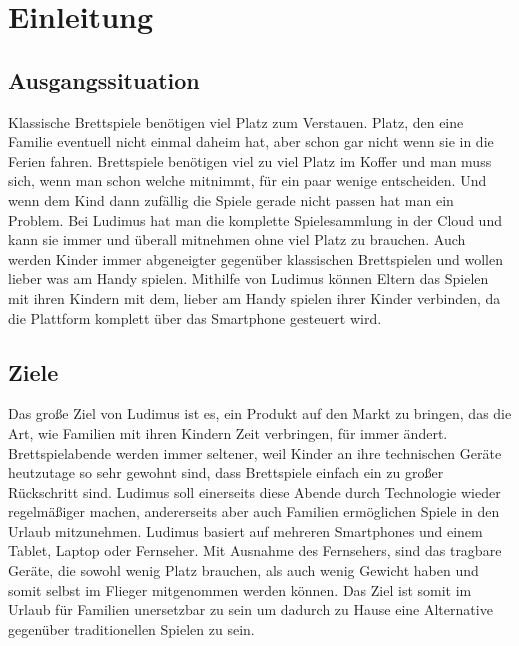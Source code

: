 \chapter{Einleitung}
\section{Ausgangssituation}
Klassische Brettspiele benötigen viel Platz zum Verstauen. Platz, den eine Familie eventuell nicht einmal daheim hat, aber schon gar nicht wenn sie in die Ferien fahren. Brettspiele benötigen viel zu viel Platz im Koffer und man muss sich, wenn man schon welche mitnimmt, für ein paar wenige entscheiden. Und wenn dem Kind dann zufällig die Spiele gerade nicht passen hat man ein Problem. Bei Ludimus hat man die komplette Spielesammlung in der Cloud und kann sie immer und überall mitnehmen ohne viel Platz zu brauchen.
\newline 
Auch werden Kinder immer abgeneigter gegenüber klassischen Brettspielen und wollen lieber was am Handy spielen. Mithilfe von Ludimus können Eltern das Spielen mit ihren Kindern mit dem,  lieber am Handy spielen ihrer Kinder verbinden, da die Plattform komplett über das Smartphone gesteuert wird.

\section{Ziele}
Das große Ziel von Ludimus ist es, ein Produkt auf den Markt zu bringen, das die Art, wie Familien mit ihren Kindern Zeit verbringen, für immer ändert. Brettspielabende werden immer seltener, weil Kinder an ihre technischen Geräte heutzutage so sehr gewohnt sind, dass Brettspiele einfach ein zu großer Rückschritt sind. Ludimus soll einerseits diese Abende durch Technologie wieder regelmäßiger machen, andererseits aber auch Familien ermöglichen Spiele in den Urlaub mitzunehmen. Ludimus basiert auf mehreren Smartphones und einem Tablet, Laptop oder Fernseher. Mit Ausnahme des Fernsehers, sind das tragbare Geräte, die sowohl wenig Platz brauchen, als auch wenig Gewicht haben und somit selbst im Flieger mitgenommen werden können. 
Das Ziel ist somit im Urlaub für Familien unersetzbar zu sein um dadurch zu Hause eine Alternative gegenüber traditionellen Spielen zu sein.

